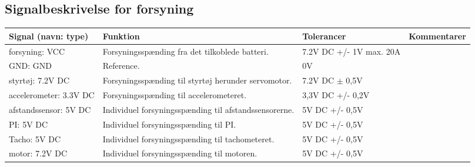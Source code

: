 \subsection{Signalbeskrivelse for forsyning}

\begin{table}[h]
	\centering
	\begin{tabularx}{\textwidth}{|l|X|X|X|} \hline
	\textbf{Signal (navn: type)} & \textbf{Funktion} & \textbf{Tolerancer} & \textbf{Kommentarer} \\ \hline
forsyning: VCC
	& Forsyningsspænding fra det tilkoblede batteri. 
	& 7.2V DC +/- 1V max. 20A
 	& ~
	\\ \hline
	
GND: GND
	& Reference. 
	& 0V
 	& ~
	\\ \hline
	
styrtøj: 7.2V DC
	& Forsyningsspænding til styrtøj herunder servomotor. 
	& 7.2V DC $\pm$ 0,5V %
 	& ~
	\\ \hline
	
accelerometer: 3.3V DC
	& Forsyningsspænding til accelerometeret.
	& 3,3V DC +/- 0,2V %
 	& ~
	\\ \hline
	
afstandssensor: 5V DC
	& Individuel forsyningsspænding til afstandssensorerne.
	& 5V DC +/- 0,5V %
 	& ~
	\\ \hline
	
PI: 5V DC
	& Individuel forsyningsspænding til PI.
	& 5V DC +/- 0,5V %
 	& ~
	\\ \hline
	
Tacho: 5V DC
	& Individuel forsyningsspænding til tachometeret.
	& 5V DC +/- 0,5V %
 	& ~
	\\ \hline
	
motor: 7.2V DC
	& Individuel forsyningsspænding til motoren.
	& 5V DC +/- 0,5V %
 	& ~
	\\ \hline
	\end{tabularx}
\end{table}